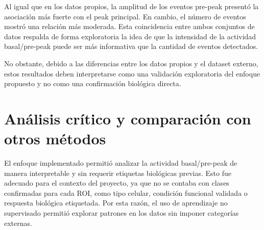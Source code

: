 \documentclass[10pt,twocolumn]{article}
\begin{document}
\begin{table}[H]
\centering
\caption{Correlación entre variables pre-peak y peak principal en dataset externo.}
\label{tab:correlacion_externo}
\end{table}

Al igual que en los datos propios, la amplitud de los eventos pre-peak presentó la asociación más fuerte con el peak principal. En cambio, el número de eventos mostró una relación más moderada. Esta coincidencia entre ambos conjuntos de datos respalda de forma exploratoria la idea de que la intensidad de la actividad basal/pre-peak puede ser más informativa que la cantidad de eventos detectados.

No obstante, debido a las diferencias entre los datos propios y el dataset externo, estos resultados deben interpretarse como una validación exploratoria del enfoque propuesto y no como una confirmación biológica directa.
\section{Análisis crítico y comparación con otros métodos}

El enfoque implementado permitió analizar la actividad basal/pre-peak de manera interpretable y sin requerir etiquetas biológicas previas. Esto fue adecuado para el contexto del proyecto, ya que no se contaba con clases confirmadas para cada ROI, como tipo celular, condición funcional validada o respuesta biológica etiquetada. Por esta razón, el uso de aprendizaje no supervisado permitió explorar patrones en los datos sin imponer categorías externas.
\end{document}

